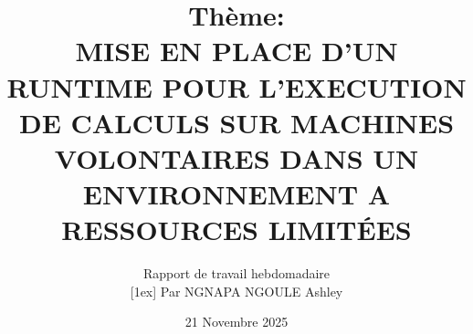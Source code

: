 \title[Title Short]{Thème: \\ MISE EN PLACE D'UN RUNTIME POUR L'EXECUTION DE CALCULS SUR MACHINES VOLONTAIRES DANS UN ENVIRONNEMENT A RESSOURCES LIMITÉES}
\author[Name]{ Rapport de travail hebdomadaire\texorpdfstring{\\}{and}[1ex] {\small Par NGNAPA NGOULE Ashley}}
\date[]{21 Novembre 2025}